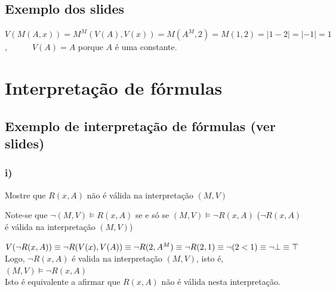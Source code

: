 \documentclass[11pt]{report}
\begin{document}
{{        \subsection*{Exemplo dos slides} {
            $V(M(A, x)) = M^M(V(A), V(x)) = M(A^M, 2) = M(1,2) = |1-2| = |-1| = 1$,~~~~~~$V(A) = A$ porque $A$ é uma constante.
        }
    }
    \section*{Interpretação de fórmulas} {
        \subsection*{Exemplo de interpretação de fórmulas (ver slides)} {
            \subsubsection*{i)} {
                Mostre que $R(x, A)$ não é válida na interpretação $(M,V)$\\
                \par Note-se que $\neg (M,V)\models R(x,A)$ se e só se $(M,V) \models \neg R(x,A)$ ($\neg R(x,A)$ é válida na interpretação $(M,V)$)\\
                \par $V(\neg R(x,A))\equiv\neg R(V(x),V(A))\equiv\neg R(2, A^M)\equiv\neg R(2, 1)\\\equiv\neg(2 < 1)\equiv\neg\bot\equiv\top $\\Logo, $\neg R(x, A)$ é valida na interpretação $(M,V)$, isto é, $(M,V)\models\neg R(x, A)$\\
                Isto é equivalente a afirmar que $R(x,A)$ não é válida nesta interpretação.
            }
        }
    }
    }
\end{document}

